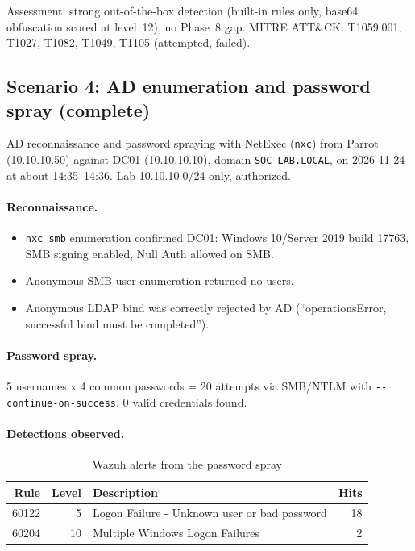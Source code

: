 \documentclass[11pt,a4paper]{article}
\begin{document}
Assessment: strong out-of-the-box detection (built-in rules only, base64
obfuscation scored at level~12), no Phase~8 gap. MITRE ATT\&CK: T1059.001,
T1027, T1082, T1049, T1105 (attempted, failed).

\subsection{Scenario 4: AD enumeration and password spray (complete)}

AD reconnaissance and password spraying with NetExec (\texttt{nxc}) from
Parrot (10.10.10.50) against DC01 (10.10.10.10), domain
\texttt{SOC-LAB.LOCAL}, on 2026-11-24 at about 14:35--14:36. Lab
10.10.10.0/24 only, authorized.

\paragraph{Reconnaissance.}
\begin{itemize}
  \item \texttt{nxc smb} enumeration confirmed DC01: Windows 10/Server 2019
        build 17763, SMB signing enabled, Null Auth allowed on SMB.
  \item Anonymous SMB user enumeration returned no users.
  \item Anonymous LDAP bind was correctly rejected by AD
        (``operationsError, successful bind must be completed'').
\end{itemize}

\paragraph{Password spray.} 5 usernames x 4 common passwords = 20 attempts
via SMB/NTLM with \texttt{-{}-continue-on-success}. 0 valid credentials
found.

\paragraph{Detections observed.}
\begin{table}[h]
\centering
\begin{tabular}{rrlr}
\toprule
Rule & Level & Description & Hits \\
\midrule
60122 & 5 & Logon Failure - Unknown user or bad password & 18 \\
60204 & 10 & Multiple Windows Logon Failures & 2 \\
\bottomrule
\end{tabular}
\caption{Wazuh alerts from the password spray}
\end{table}
\end{document}
